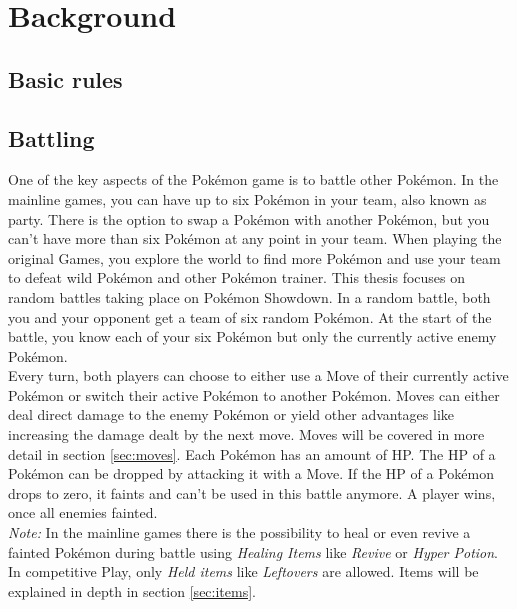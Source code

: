 \chapter{Background}

\section{Basic rules}
\section{Battling}
\label{sec:battling}
One of the key aspects of the Pokémon game is to battle other Pokémon. In the mainline games, you can 
have up to six Pokémon in your team, also known as party. There is the option to swap a Pokémon with
another Pokémon, but you can't have more than six Pokémon at any point in your team. When playing the 
original Games, you explore the world to find more Pokémon and use your team to defeat wild Pokémon
and other Pokémon trainer. This thesis focuses on random battles taking place on Pokémon Showdown.
In a random battle, both you and your opponent get a team of six random Pokémon. At the start of the battle,
you know each of your six Pokémon but only the currently active enemy Pokémon. \\
Every turn, both players can choose to either use a Move of their currently active Pokémon or switch
their active Pokémon to another Pokémon. Moves can either deal direct damage to the enemy Pokémon or 
yield other advantages like increasing the damage dealt by the next move. Moves will be covered in more
detail in section \ref{sec:moves}. Each Pokémon has an amount of \ac{HP}. The \ac{HP} of a Pokémon
can be dropped by attacking it with a Move. If the \ac{HP} of a Pokémon drops to zero, it faints and 
can't be used in this battle anymore. A player wins, once all enemies fainted. \\
\textit{Note:} In the mainline games there is the possibility to heal or even revive a fainted 
Pokémon during battle using \textit{Healing Items} like \textit{Revive} or \textit{Hyper Potion}.
In competitive Play, only \textit{Held items} like \textit{Leftovers} are allowed. Items will be explained
in depth in section \ref{sec:items}.


